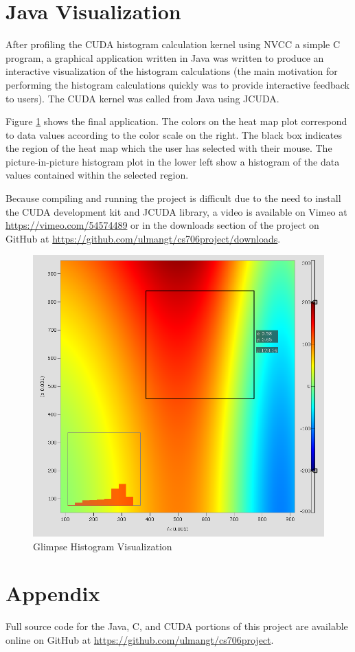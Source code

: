 \documentclass{article}
\begin{document}
\section{Java Visualization}\label{visualization}

After profiling the CUDA histogram calculation kernel using NVCC a simple C program, a graphical application written in Java was written to produce an interactive visualization of the histogram calculations (the main motivation for performing the histogram calculations quickly was to provide interactive feedback to users). The CUDA kernel was called from Java using JCUDA\cite{jcuda}.

Figure \ref{histogram1} shows the final application. The colors on the heat map plot correspond to data values according to the color scale on the right. The black box indicates the region of the heat map which the user has selected with their mouse. The picture-in-picture histogram plot in the lower left show a histogram of the data values contained within the selected region.

Because compiling and running the project is difficult due to the need to install the CUDA development kit and JCUDA library, a video is available on Vimeo at \url{https://vimeo.com/54574489} or in the downloads section of the project on GitHub at \url{https://github.com/ulmangt/cs706project/downloads}.

\begin{figure}
\centering
\includegraphics[width=1.0\textwidth]{screenshots/glimpse/GlimpseHistogramPlot.png}
\caption{Glimpse Histogram Visualization}
\label{histogram1}
\end{figure}

\section{Appendix}\label{appendix}

Full source code for the Java, C, and CUDA portions of this project are available online on GitHub at \url{https://github.com/ulmangt/cs706project}.



\end{document}
